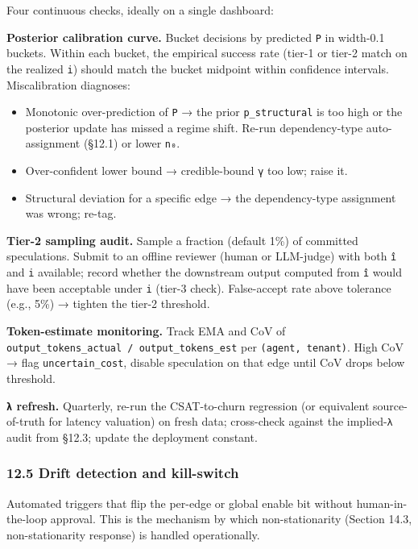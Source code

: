 \documentclass[
  11pt,
]{article}
\providecommand{\tightlist}{%
  \setlength{\itemsep}{0pt}\setlength{\parskip}{0pt}}
\begin{document}
Four continuous checks, ideally on a single dashboard:

\textbf{Posterior calibration curve.} Bucket decisions by predicted
\texttt{P} in width-0.1 buckets. Within each bucket, the empirical
success rate (tier-1 or tier-2 match on the realized \texttt{i}) should
match the bucket midpoint within confidence intervals. Miscalibration
diagnoses:

\begin{itemize}
\tightlist
\item
  Monotonic over-prediction of \texttt{P} → the prior
  \texttt{p\_structural} is too high or the posterior update has missed
  a regime shift. Re-run dependency-type auto-assignment (§12.1) or
  lower \texttt{n₀}.
\item
  Over-confident lower bound → credible-bound \texttt{γ} too low; raise
  it.
\item
  Structural deviation for a specific edge → the dependency-type
  assignment was wrong; re-tag.
\end{itemize}

\textbf{Tier-2 sampling audit.} Sample a fraction (default 1\%) of
committed speculations. Submit to an offline reviewer (human or
LLM-judge) with both \texttt{î} and \texttt{i} available; record whether
the downstream output computed from \texttt{î} would have been
acceptable under \texttt{i} (tier-3 check). False-accept rate above
tolerance (e.g., 5\%) → tighten the tier-2 threshold.

\textbf{Token-estimate monitoring.} Track EMA and CoV of
\texttt{output\_tokens\_actual\ /\ output\_tokens\_est} per
\texttt{(agent,\ tenant)}. High CoV → flag \texttt{uncertain\_cost},
disable speculation on that edge until CoV drops below threshold.

\textbf{\texttt{λ} refresh.} Quarterly, re-run the CSAT-to-churn
regression (or equivalent source-of-truth for latency valuation) on
fresh data; cross-check against the implied-\texttt{λ} audit from §12.3;
update the deployment constant.

\subsubsection{12.5 Drift detection and
kill-switch}\label{drift-detection-and-kill-switch}

Automated triggers that flip the per-edge or global enable bit without
human-in-the-loop approval. This is the mechanism by which
non-stationarity (Section 14.3, non-stationarity response) is handled
operationally.
\end{document}

